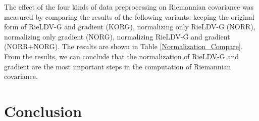 \documentclass[review]{elsarticle}
\begin{document}
	The effect of the four kinds of data preprocessing on Riemannian covariance was measured by comparing the results of the following variants: keeping the original form of RieLDV-G and gradient (KORG), normalizing only  RieLDV-G (NORR), normalizing only gradient (NORG), normalizing RieLDV-G and gradient (NORR+NORG). The results are shown in Table \ref{Normalization_Compare}. From the results, we can conclude that the normalization of RieLDV-G and gradient are the most important steps in the computation of Riemannian covariance.
\begin{table}
\renewcommand\arraystretch{0.9}
\centering
\caption{\label{tab:overlapping} The effect of four kinds of data preprocessing on the Riemannian covariance.}
\vspace {1.5mm}
\label{Normalization_Compare}
\small
{}
\end{table}
\section{Conclusion}
\indent 
\end{document}
